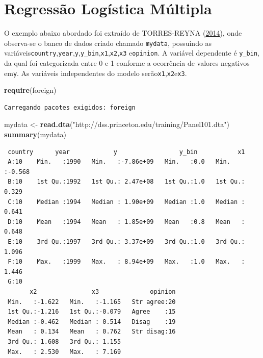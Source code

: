 \documentclass[12pt,brazil,oneside]{book}
\newenvironment{Shaded}{\begin{snugshade}}{\end{snugshade}}
\newcommand{\KeywordTok}[1]{\textcolor[rgb]{0.13,0.29,0.53}{\textbf{#1}}}
\newcommand{\NormalTok}[1]{#1}
\newcommand{\StringTok}[1]{\textcolor[rgb]{0.31,0.60,0.02}{#1}}
\begin{document}
\hypertarget{regressao-logistica-multipla}{%
\section{Regressão Logística
Múltipla}\label{regressao-logistica-multipla}}

O exemplo abaixo abordado foi extraído de TORRES-REYNA
(\protect\hyperlink{ref-Torres-Reyna2014}{2014}), onde observa-se o
banco de dados criado chamado \texttt{mydata}, possuindo as
variáveis\texttt{country},\texttt{year},\texttt{y},\texttt{y\_bin},\texttt{x1},\texttt{x2},\texttt{x3}
e\texttt{opinion}. A variável dependente é \texttt{y\_bin}, da qual foi
categorizada entre 0 e 1 conforme a ocorrência de valores negativos
em\texttt{y}. As variáveis independentes do modelo
serão\texttt{x1},\texttt{x2}e\texttt{x3}.

\begin{Shaded}
\begin{Highlighting}[]
\KeywordTok{require}\NormalTok{(foreign)}
\end{Highlighting}
\end{Shaded}

\begin{verbatim}
Carregando pacotes exigidos: foreign
\end{verbatim}

\begin{Shaded}
\begin{Highlighting}[]
\NormalTok{mydata <-}\StringTok{ }\KeywordTok{read.dta}\NormalTok{(}\StringTok{"http://dss.princeton.edu/training/Panel101.dta"}\NormalTok{) }
\KeywordTok{summary}\NormalTok{(mydata)}
\end{Highlighting}
\end{Shaded}

\begin{verbatim}
 country      year            y                 y_bin           x1        
 A:10    Min.   :1990   Min.   :-7.86e+09   Min.   :0.0   Min.   :-0.568  
 B:10    1st Qu.:1992   1st Qu.: 2.47e+08   1st Qu.:1.0   1st Qu.: 0.329  
 C:10    Median :1994   Median : 1.90e+09   Median :1.0   Median : 0.641  
 D:10    Mean   :1994   Mean   : 1.85e+09   Mean   :0.8   Mean   : 0.648  
 E:10    3rd Qu.:1997   3rd Qu.: 3.37e+09   3rd Qu.:1.0   3rd Qu.: 1.096  
 F:10    Max.   :1999   Max.   : 8.94e+09   Max.   :1.0   Max.   : 1.446  
 G:10                                                                     
       x2               x3              opinion  
 Min.   :-1.622   Min.   :-1.165   Str agree:20  
 1st Qu.:-1.216   1st Qu.:-0.079   Agree    :15  
 Median :-0.462   Median : 0.514   Disag    :19  
 Mean   : 0.134   Mean   : 0.762   Str disag:16  
 3rd Qu.: 1.608   3rd Qu.: 1.155                 
 Max.   : 2.530   Max.   : 7.169                 
                                                 
\end{verbatim}
\end{document}
